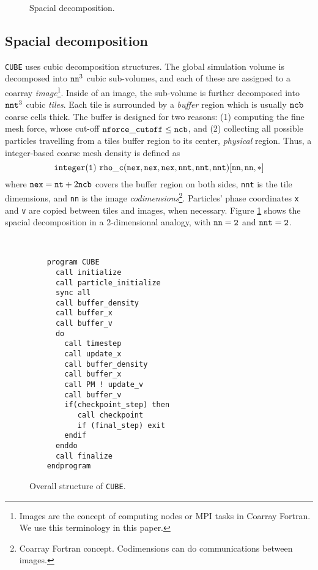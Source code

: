 \documentclass[10pt,twocolumn,preprint]{emulateapj}
\begin{document}
\begin{figure}[t]
 \caption{Spacial decomposition.}
\label{fig.tile}
\end{figure}

\subsection{Spacial decomposition}
{\tt CUBE} uses cubic decomposition structures. The global simulation volume is decomposed into ${\tt nn}^3$ cubic sub-volumes, and each of these are assigned to a coarray {\it image}\footnote{Images are the concept of computing nodes or MPI tasks in Coarray Fortran. We use this terminology in this paper.}. Inside of an image, the sub-volume is further decomposed into ${\tt nnt}^3$ cubic {\it tiles}. Each tile is surrounded by a {\it buffer} region which is usually ${\tt ncb}$ coarse cells thick. The buffer is designed for two reasons: (1) computing the fine mesh force, whose cut-off ${\tt nforce\_cutoff}\leq{\tt ncb}$, and (2) collecting all possible particles travelling from a tiles buffer region to its center, {\it physical} region. Thus, a integer-based coarse mesh density is defined as
\begin{equation*}
{\tt integer(1)\ rho\_c(nex,nex,nex,nnt,nnt,nnt)[nn,nn,*]}\\
\end{equation*}
where ${\tt nex}={\tt nt}+2{\tt ncb}$ covers the buffer region on both sides, {\tt nnt} is the tile dimemsions, and {\tt nn} is the image {\it codimensions}\footnote{Coarray Fortran concept. Codimensions can do communications between images.}. Particles' phase coordinates {\tt x} and {\tt v} are copied between tiles and images, when necessary. Figure \ref{fig.tile} shows the spacial decomposition in a 2-dimensional analogy, with ${\tt nn=2}$ and ${\tt nnt=2}$.

\begin{figure}[t]
\begin{verbatim}


    program CUBE
      call initialize
      call particle_initialize
      sync all
      call buffer_density
      call buffer_x
      call buffer_v
      do
        call timestep
        call update_x
        call buffer_density
        call buffer_x
        call PM ! update_v
        call buffer_v
        if(checkpoint_step) then
           call checkpoint
           if (final_step) exit
        endif
      enddo
      call finalize
    endprogram
\end{verbatim}
\caption{Overall structure of {\tt CUBE}.}
\label{fig.code}
\end{figure}
\end{document}
